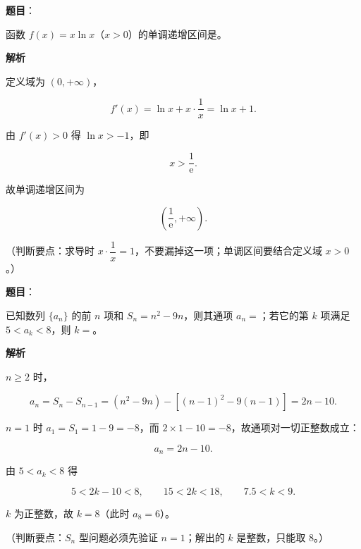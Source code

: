 \begin{answer}

\textbf{题目}：

函数 $f(x)=x\ln x$（$x>0$）的单调递增区间是\gkblank{}。

\textbf{解析}

定义域为 $(0,+\infty)$，

\nopagebreak[4]
\[f'(x)=\ln x+x\cdot\frac1x=\ln x+1.\]

由 $f'(x)>0$ 得 $\ln x>-1$，即

\nopagebreak[4]
\[x>\frac1{\mathrm e}.\]

故单调递增区间为

\nopagebreak[4]
\[\left(\frac1{\mathrm e},+\infty\right).\]

（判断要点：求导时 $x\cdot\dfrac1x=1$，不要漏掉这一项；单调区间要结合定义域 $x>0$。）


\end{answer}
\begin{answer}

\textbf{题目}：

已知数列 $\{a_n\}$ 的前 $n$ 项和 $S_n=n^2-9n$，则其通项 $a_n=$\gkblank{}；若它的第 $k$ 项满足 $5<a_k<8$，则 $k=$\gkblank{}。

\textbf{解析}

$n\geqslant2$ 时，

\nopagebreak[4]
\[a_n=S_n-S_{n-1}=(n^2-9n)-[(n-1)^2-9(n-1)]=2n-10.\]

$n=1$ 时 $a_1=S_1=1-9=-8$，而 $2\times1-10=-8$，故通项对一切正整数成立：

\nopagebreak[4]
\[a_n=2n-10.\]

由 $5<a_k<8$ 得

\nopagebreak[4]
\[5<2k-10<8,\qquad 15<2k<18,\qquad 7.5<k<9.\]

$k$ 为正整数，故 $k=8$（此时 $a_8=6$）。

（判断要点：$S_n$ 型问题必须先验证 $n=1$；解出的 $k$ 是整数，只能取 $8$。）


\end{answer}
